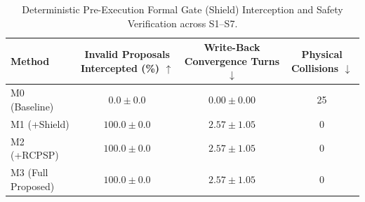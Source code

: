 \begin{table}[t]
\centering
\caption{Deterministic Pre-Execution Formal Gate (Shield) Interception and Safety Verification across S1--S7.}
\label{tab:safety_gate_shield}
\begin{tabular}{lccc}
\toprule
\textbf{Method} & \textbf{Invalid Proposals Intercepted (\%)} $\uparrow$ & \textbf{Write-Back Convergence Turns} $\downarrow$ & \textbf{Physical Collisions} $\downarrow$ \\
\midrule
M0 (Baseline) & $0.0 \pm 0.0$ & $0.00 \pm 0.00$ & 25 \\
M1 (+Shield) & $100.0 \pm 0.0$ & $2.57 \pm 1.05$ & 0 \\
M2 (+RCPSP) & $100.0 \pm 0.0$ & $2.57 \pm 1.05$ & 0 \\
M3 (Full Proposed) & $100.0 \pm 0.0$ & $2.57 \pm 1.05$ & 0 \\
\bottomrule
\end{tabular}
\end{table}
